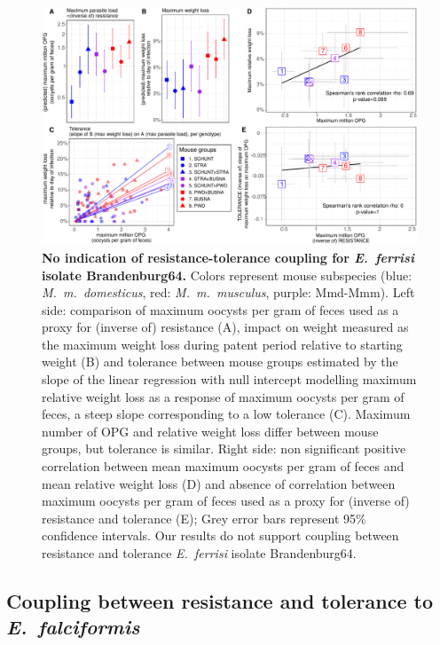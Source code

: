 \begin{figure}[H]
    \centering
    \includegraphics[width=\linewidth,height=\textheight,keepaspectratio]{images/3article2/Fig4_final.pdf}
    \caption{\textbf{No indication of resistance-tolerance coupling for \textit{E.~ferrisi} isolate Brandenburg64.} Colors represent mouse subspecies (blue: \textit{M.~m.~domesticus}, red: \textit{M.~m.~musculus}, purple: Mmd-Mmm). Left side: comparison of maximum oocysts per gram of feces used as a proxy for (inverse of) resistance (A), impact on weight measured as the maximum weight loss during patent period relative to starting weight (B) and tolerance between mouse groups estimated by the slope of the linear regression with null intercept modelling maximum relative weight loss as a response of maximum oocysts per gram of feces, a steep slope corresponding to a low tolerance (C). Maximum number of OPG and relative weight loss differ between mouse groups, but tolerance is similar. Right side: non significant positive correlation between mean maximum oocysts per gram of feces and mean relative weight loss (D) and absence of correlation between maximum oocysts per gram of feces used as a proxy for (inverse of) resistance and tolerance (E); Grey error bars represent 95\% confidence intervals. Our results do not support coupling between resistance and tolerance \textit{E.~ferrisi} isolate Brandenburg64.}
\end{figure}

\subsection{Coupling between resistance and tolerance to \textit{E.~falciformis}}

